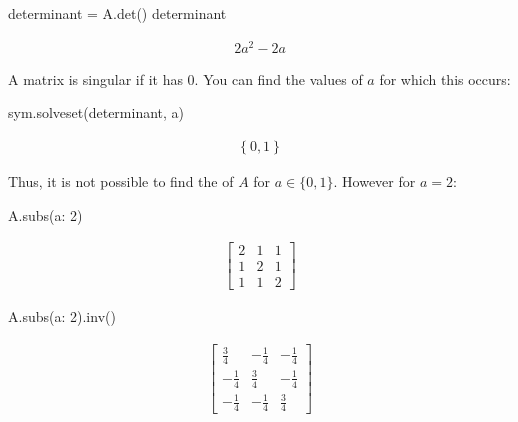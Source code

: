 \begin{pyin}
determinant = A.det()
determinant
\end{pyin}




\begin{equation*}
\begin{split}\displaystyle 2 a^{2} - 2 a\end{split}
\end{equation*}




A matrix is singular if it has  0. You can find the values of \(a\) for
which this occurs:




\begin{pyin}
sym.solveset(determinant, a)
\end{pyin}




\begin{equation*}
\begin{split}\displaystyle \left\{0, 1\right\}\end{split}
\end{equation*}

Thus, it is not possible to find the  of \(A\) for \(a\in\{0, 1\}\).
However for \(a = 2\):




\begin{pyin}
A.subs({a: 2})
\end{pyin}




\begin{equation*}
\begin{split}\displaystyle \left[\begin{matrix}2 & 1 & 1\\1 & 2 & 1\\1 & 1 & 2\end{matrix}\right]\end{split}
\end{equation*}






\begin{pyin}
A.subs({a: 2}).inv()
\end{pyin}




\begin{equation*}
\begin{split}\displaystyle \left[\begin{matrix}\frac{3}{4} & - \frac{1}{4} & - \frac{1}{4}\\- \frac{1}{4} & \frac{3}{4} & - \frac{1}{4}\\- \frac{1}{4} & - \frac{1}{4} & \frac{3}{4}\end{matrix}\right]\end{split}
\end{equation*}




